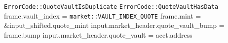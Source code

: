 \begin{algorithm}
\begin{algorithmic}
    \RETURN \texttt{ErrorCode::QuoteVaultIsDuplicate}
  \ENDIF
    \RETURN \texttt{ErrorCode::QuoteVaultHasData}
  \ENDIF
  \STATE frame.vault\_index = \texttt{market::VAULT\_INDEX\_QUOTE}
  \STATE frame.mint = \&input\_shifted.quote\_mint
  \STATE {}
  \STATE input.market\_header.quote\_vault\_bump = frame.bump
  \STATE input.market\_header.quote\_vault = acct.address
\ENDPROCEDURE
\end{algorithmic}
\end{algorithm}
